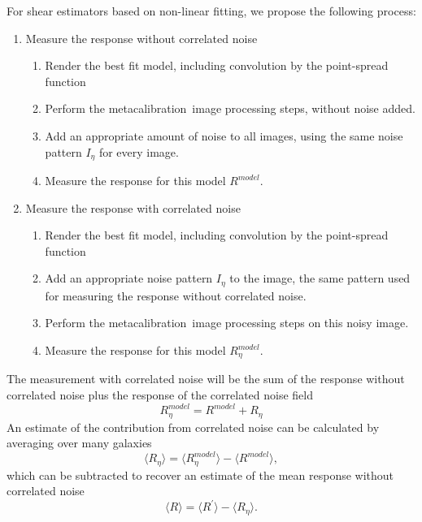 \documentclass[usegraphicx,usenatbib]{mn2e}
\newcommand{\mcal}{metacalibration}
\begin{document}
For shear estimators based on non-linear fitting, we propose the following
process:
\begin{enumerate}[label=\arabic*.]

    \item Measure the response without correlated noise
    
        \begin{enumerate}[label*=\arabic*.]
            \item Render the best fit model, including convolution by the point-spread
                function

            \item Perform the \mcal\ image processing steps, without noise added.

            \item Add an appropriate amount of noise to all images, using the
                same noise pattern $I_\eta$ for every image.

            \item Measure the response for this model $R^{model}$.
        \end{enumerate}

    \item Measure the response with correlated noise
    
        \begin{enumerate}[label*=\arabic*.]
            \item Render the best fit model, including convolution by the point-spread
                function

            \item Add an appropriate noise pattern $I_\eta$ to the image, the
                same pattern used for measuring the response without correlated
                noise.

            \item Perform the \mcal\ image processing steps on this noisy
                image.

            \item Measure the response for this model $R^{model}_{\eta}$.

        \end{enumerate}

\end{enumerate}

The measurement with correlated noise will be the sum of the response
without correlated noise plus the response of the correlated noise field
\begin{equation}
    R^{model}_\eta = R^{model} + R_\eta
\end{equation}
An estimate of the contribution from correlated noise can
be calculated by averaging over many galaxies
\begin{equation}
    \langle R_\eta \rangle = \langle R^{model}_\eta \rangle - \langle R^{model} \rangle,
\end{equation}
which can be subtracted to recover an estimate of the mean response without
correlated noise
\begin{equation}
    \langle R \rangle = \langle R^\prime \rangle - \langle R_\eta \rangle.
\end{equation}
\end{document}
